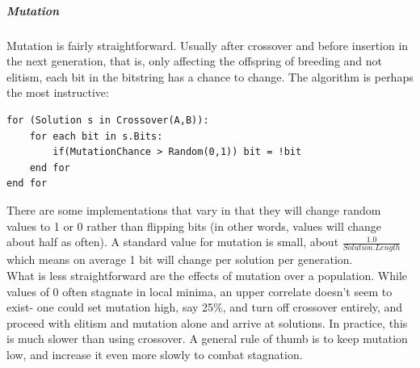\subparagraph{Mutation}
Mutation is fairly straightforward.  Usually after crossover and before insertion in the next generation, that is, only affecting the offspring of breeding and not elitism, each bit in the bitstring has a chance to change.  The algorithm is perhaps the most instructive: \begin{lstlisting}
for (Solution s in Crossover(A,B)):
	for each bit in s.Bits:
		if(MutationChance > Random(0,1)) bit = !bit
	end for
end for
\end{lstlisting}
There are some implementations that vary in that they will change random values to 1 or 0 rather than flipping bits (in other words, values will change about half as often).  A standard value for mutation is small, about 
${\frac{1.0}{Solution.Length}}$ which means on average 1 bit will change per solution per generation.\\
What is less straightforward are the effects of mutation over a population.  While values of 0 often stagnate in local minima, an upper correlate doesn't seem to exist- one could set mutation high, say 25\%, and turn off crossover entirely, and proceed with elitism and mutation alone and arrive at solutions.  In practice, this is much slower than using crossover. A general rule of thumb is to keep mutation low, and increase it even more slowly to combat stagnation.\\
